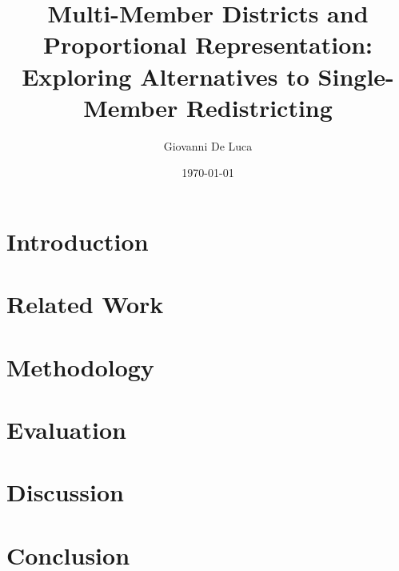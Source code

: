 \documentclass[12pt]{article}
\title{Multi-Member Districts and Proportional Representation: \\
       Exploring Alternatives to Single-Member Redistricting}
\author{Giovanni De Luca}
\date{\today}
\begin{document}
\maketitle

\begin{abstract}
\end{abstract}

\section{Introduction}


\section{Related Work}


\section{Methodology}


\section{Evaluation}


\section{Discussion}


\section{Conclusion}




\end{document}
